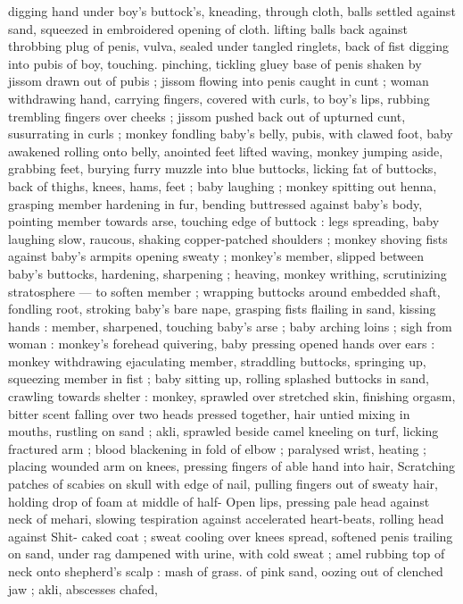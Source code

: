 digging hand under boy's buttock’s, kneading, through cloth, balls
settled against sand, squeezed in embroidered opening of cloth.
lifting balls back against throbbing plug of penis, vulva, sealed under
tangled ringlets, back of fist digging into pubis of boy, touching.
pinching, tickling gluey base of penis shaken by jissom drawn out of
pubis ; jissom flowing into penis caught in cunt ; woman withdrawing
hand, carrying fingers, covered with curls, to boy's lips, rubbing
trembling fingers over cheeks ; jissom pushed back out of upturned
cunt, susurrating in curls ; monkey fondling baby's belly, pubis, with
clawed foot, baby awakened rolling onto belly, anointed feet lifted
waving, monkey jumping aside, grabbing feet, burying furry muzzle
into blue buttocks, licking fat of buttocks, back of thighs, knees,
hams, feet ; baby laughing ; monkey spitting out henna, grasping
member hardening in fur, bending buttressed against baby's body,
pointing member towards arse, touching edge of buttock : legs
spreading, baby laughing slow, raucous, shaking copper-patched
shoulders ; monkey shoving fists against baby’s armpits opening
sweaty ; monkey's member, slipped between baby's buttocks,
hardening, sharpening ; heaving, monkey writhing, scrutinizing
stratosphere --- to soften member ; wrapping buttocks around
embedded shaft, fondling root, stroking baby's bare nape, grasping
fists flailing in sand, kissing hands : member, sharpened, touching
baby's arse ; baby arching loins ; sigh from woman : monkey's
forehead quivering, baby pressing opened hands over ears : monkey
withdrawing ejaculating member, straddling buttocks, springing up,
squeezing member in fist ; baby sitting up, rolling splashed buttocks
in sand, crawling towards shelter : monkey, sprawled over stretched
skin, finishing orgasm, bitter scent falling over two heads pressed
together, hair untied mixing in mouths, rustling on sand ; akli,
sprawled beside camel kneeling on turf, licking fractured arm ; blood
blackening in fold of elbow ; paralysed wrist, heating ; placing
wounded arm on knees, pressing fingers of able hand into hair,
Scratching patches of scabies on skull with edge of nail, pulling
fingers out of sweaty hair, holding drop of foam at middle of half-
Open lips, pressing pale head against neck of mehari, slowing
tespiration against accelerated heart-beats, rolling head against
Shit- caked coat ; sweat cooling over knees spread, softened penis
trailing on sand, under rag dampened with urine, with cold sweat ;
amel rubbing top of neck onto shepherd's scalp : mash of grass. of
pink sand, oozing out of clenched jaw ; akli, abscesses chafed,
